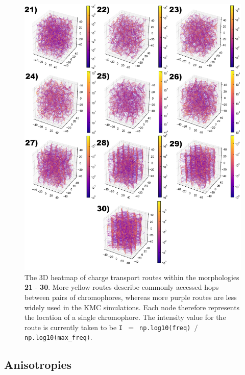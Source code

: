 \documentclass[12pt]{article}
\begin{document}
\begin{figure}[h!]\centering
	\includegraphics[width=\textwidth]{Figures/3dHoleFrameOrig.png}
    \caption{The 3D heatmap of charge transport routes within the morphologies \textbf{21} - \textbf{30}.
    More yellow routes describe commonly accessed hops between pairs of chromophores, whereas more purple routes are less widely used in the KMC simulations.
    Each node therefore represents the location of a single chromophore.
The intensity value for the route is currently taken to be \texttt{I $=$ np.log10(freq) $/$ np.log10(max\_freq)}.}
	\label{fig:3dNetworkFrameOrig}
\end{figure}

\clearpage
\subsection{Anisotropies}
\end{document}
